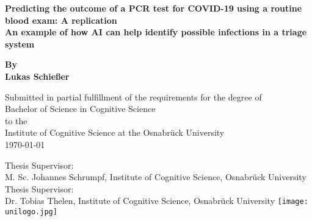 \begin{titlepage}
	\begin{center}
		\vspace*{1cm}
		\Huge
		\textbf{Predicting the outcome of a PCR test for COVID-19 using a 
routine blood exam: A replication \\} 
		\vspace{0.5cm}
		\Large
		\textbf{An example of how AI can help identify possible infections in 
a triage system}
		
		\vspace{1cm}
		
		\textbf{By \\ Lukas Schießer}
		
		\vspace{1cm}
		\small
		Submitted in partial fulfillment of the requirements for the degree of \\
		Bachelor of Science in Cognitive Science \\ to the \\
		Institute of Cognitive Science at the Osnabrück University\\
		\today
		
		\vfill
		\vspace{1cm}
		Thesis Supervisor:\\ M. Sc. Johannes Schrumpf, Institute of Cognitive 
Science, Osnabrück University \\
		Thesis Supervisor:\\   Dr. Tobias Thelen, Institute of Cognitive 
Science, Osnabrück University
		\vfill 
		\texttt{[image: unilogo.jpg]}
		
		
	\end{center}
\end{titlepage}
